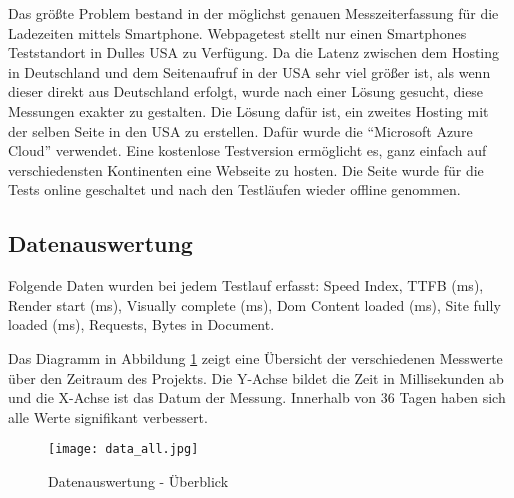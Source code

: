 		Das größte Problem bestand in der möglichst genauen Messzeiterfassung für die Ladezeiten mittels Smartphone. Webpagetest stellt nur einen Smartphones Teststandort in Dulles USA zu Verfügung. Da die Latenz zwischen dem Hosting in Deutschland und dem Seitenaufruf in der USA sehr viel größer ist, als wenn dieser direkt aus Deutschland erfolgt, wurde nach einer Lösung gesucht, diese Messungen exakter zu gestalten.
		Die Lösung dafür ist, ein zweites Hosting mit der selben Seite in den USA zu erstellen. Dafür wurde die "`Microsoft Azure Cloud"' verwendet. Eine kostenlose Testversion ermöglicht es, ganz einfach auf verschiedensten Kontinenten eine Webseite zu hosten. Die Seite wurde für die Tests online geschaltet und nach den Testläufen wieder offline genommen.


	\subsection{Datenauswertung}
	\label{sub:datenauswertung}
		Folgende Daten wurden bei jedem Testlauf erfasst: Speed Index, TTFB (ms), Render start (ms), Visually complete (ms), Dom Content loaded (ms), Site fully loaded (ms), Requests, Bytes in Document.

    Das Diagramm in Abbildung \ref{fig:data_all} zeigt eine Übersicht der verschiedenen Messwerte über den Zeitraum des Projekts. Die Y-Achse bildet die Zeit in Millisekunden ab und die X-Achse ist das Datum der Messung. Innerhalb von 36 Tagen haben sich alle Werte signifikant verbessert.

    \begin{figure}[htbp]
    	\begin{center}
    		\texttt{[image: data\_all.jpg]}
    		\caption{Datenauswertung - Überblick}
    		\label{fig:data_all}
    	\end{center}
    \end{figure}

